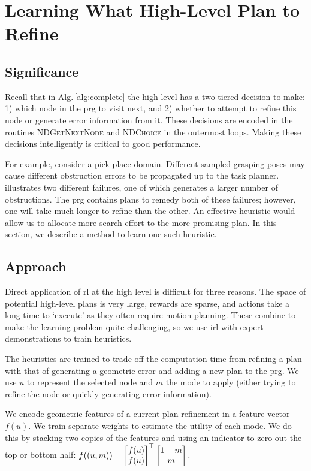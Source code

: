 \section{Learning What High-Level Plan to Refine}
\subsection{Significance}
Recall that in Alg.\,\ref{alg:complete} the high level has
a two-tiered decision to make: 1) which node in the {\sc prg} to visit
next, and 2) whether to attempt to refine this node or generate
error information from it. These decisions are encoded in the
routines \textsc{NDGetNextNode} and \textsc{NDChoice} in the outermost loops. Making these
decisions intelligently is critical to good performance. 

For example, consider a pick-place domain. Different sampled grasping
poses may cause different obstruction errors to be propagated up to
the task planner.  illustrates two different
failures, one of which generates a larger number of obstructions. The
{\sc prg} contains plans to remedy both of these failures; however, one
will take much longer to refine than the other. An effective heuristic
would allow us to allocate more search effort to the more promising
plan. In this section, we describe a method to learn one such
heuristic.

\subsection{Approach}
Direct application of {\sc rl} at the high level is difficult for three reasons. The
space of potential high-level plans is very large, rewards are sparse, and
actions take a long time to `execute' as they often require
motion planning. These combine to make the learning problem quite
challenging, so we use {\sc irl} with expert demonstrations to
train heuristics.

The heuristics are trained to trade off the computation time from
refining a plan with that of generating a geometric error and adding a
new plan to the {\sc prg}. We use $u$ to represent the selected node
and $m$ the mode to apply (either trying to refine the node or
quickly generating error information).

We encode geometric features of a current plan refinement in a feature
vector $f(u).$ We train separate weights to estimate the utility of
each mode. We do this by stacking two copies of the features and using
an indicator to zero out the top or bottom half: $f((u, m))
= \begin{bmatrix} f(u) \\ f(u) \end{bmatrix}^\top \begin{bmatrix} 1 -
  m \\ m \end{bmatrix}.\vspace{2pt}$ 

